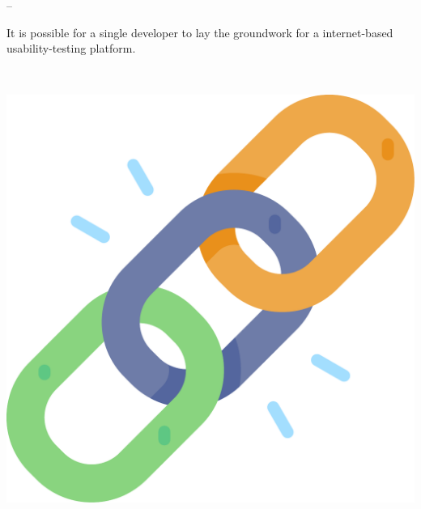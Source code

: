\documentclass[xcolor=svgnames,10pt,aspectratio=1610]{beamer}
\begin{document}
\begin{frame}
\begin{minipage}{.7\textwidth}
\begin{minipage}{0.05\textwidth}
    \end{minipage}
    \hspace{0.15cm}
    --
    \hspace{0.15cm}
    \begin{minipage}{0.9\textwidth}
      It is possible for a single developer to lay the groundwork for a
      internet-based usability-testing platform.
    \end{minipage}
  \end{minipage}

  \vspace{0.8cm} \\

  \begin{minipage}{.7\textwidth}
    \hspace{-0.3cm}
    \begin{minipage}{0.05\textwidth}
      \includegraphics[width=\textwidth]{img/connect.pdf}
    \end{minipage}
    \begin{minipage}{0.05\textwidth}

\end{minipage}
\end{minipage}
\end{frame}
\end{document}
